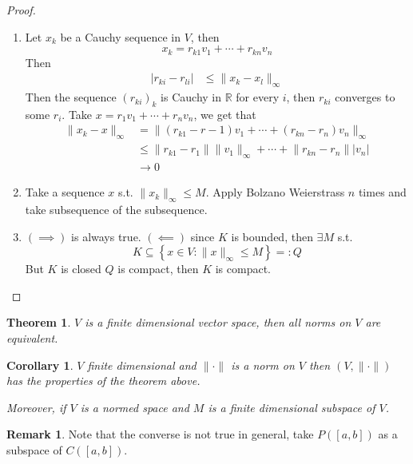 \documentclass[11pt,a4paper]{article}
\theoremstyle{definition}
\newtheorem{remark}[definition]{Remark}
\theoremstyle{plain}
\newtheorem{theorem}[definition]{Theorem}
\newtheorem{corollary}[definition]{Corollary}
\theoremstyle{remark}
\newcommand{\R}{\mathbb{R}}
\renewcommand{\set}[1]{\left\{ #1 \right\}}
\newcommand{\abs}[1]{\lvert #1 \rvert}
\newcommand{\norm}[1]{\lVert #1 \rVert}
\newcommand{\1}{\mathbbm{1}}
\begin{document}
\begin{proof}
    \begin{enumerate}
        \item Let $x_k$ be a Cauchy sequence in $V$, then 
        $$x_k = r_{k1} v_1 +\cdots + r_{kn} v_n$$
        Then 
        \begin{align*}
            \abs{r_{ki} - r_{li}} &\le \norm{x_k - x_l}_\infty 
        \end{align*}
        Then the sequence $(r_{ki})_k$ is Cauchy in $\R$ for every $i$, then $r_{ki}$ converges to some $r_i$. Take $x = r_1 v_1 + \cdots + r_n v_n$, we get that 
        \begin{align*}
            \norm{x_k - x}_\infty &= \norm{(r_{k1} - r-1) v_1 + \cdots + (r_{kn} - r_n) v_n}_\infty \\
            &\le \norm{r_{k1} - r_1} \norm{v_1}_\infty + \cdots + \norm{r_{kn} - r_n} \abs{v_n} \\
            &\to 0
        \end{align*}

        \item Take a sequence $x$ s.t. $\norm{x_k}_\infty \le M$. Apply Bolzano Weierstrass $n$ times and take subsequence of the subsequence.

        \item $(\implies)$ is always true. $(\impliedby)$ since $K$ is bounded, then $\exists M$ s.t. 
        $$K \subseteq \set{x \in V \colon \norm{x}_\infty \le M} =: Q$$
        But $K$ is closed $Q$ is compact, then $K$ is compact. 
    \end{enumerate}
\end{proof}

\begin{theorem}
    $V$ is a finite dimensional vector space, then all norms on $V$ are equivalent.
\end{theorem}

\begin{corollary}
    $V$ finite dimensional and $\norm{\cdot}$ is a norm on $V$ then $(V, \norm{\cdot})$ has the properties of the theorem above.

    Moreover, if $V$ is a normed space and $M$ is a finite dimensional subspace of $V$.
\end{corollary}

\begin{remark}
    Note that the converse is not true in general, take ${P}([a,b])$ as a subspace of $C([a,b])$.
\end{remark}
\end{document}
